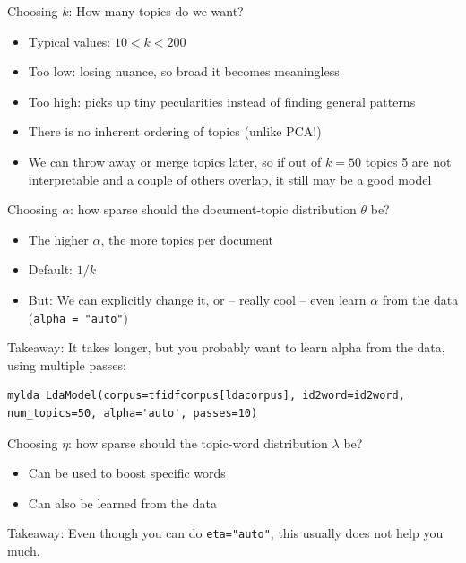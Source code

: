 \documentclass{beamer}
\begin{document}
\begin{frame}{Choosing $k$: How many topics do we want?}
\begin{itemize}
	\item Typical values: $10<k<200$
	\item Too low: losing nuance, so broad it becomes meaningless
	\item Too high: picks up tiny pecularities instead of finding general patterns
	\item There is no inherent ordering of topics (unlike PCA!)
	\item We can throw away or merge topics later, so if out of $k=50$ topics 5 are not interpretable and a couple of others overlap, it still may be a good model
\end{itemize}
\end{frame}


\begin{frame}[fragile]{Choosing $\alpha$: how sparse should the document-topic distribution $\theta$ be?}
\begin{itemize}
	\item The higher $\alpha$, the more topics per document 
	\item Default: $1/k$
	\item But: We can explicitly change it, or -- really cool -- even learn $\alpha$ from the data (\texttt{alpha = "auto"})
\end{itemize}

\pause 

Takeaway: It takes longer, but you probably want to learn alpha from the data, using multiple passes:

\begin{lstlisting}
mylda LdaModel(corpus=tfidfcorpus[ldacorpus], id2word=id2word, num_topics=50, alpha='auto', passes=10)
\end{lstlisting}


\end{frame}


\begin{frame}{Choosing $\eta$: how sparse should the topic-word distribution $\lambda$ be?}
\begin{itemize}
	\item Can be used to boost specific words
	\item Can also be learned from the data 
\end{itemize}

\pause
Takeaway: Even though you can do \texttt{eta="auto"}, this usually does not help you much.

\end{frame}
\end{document}
